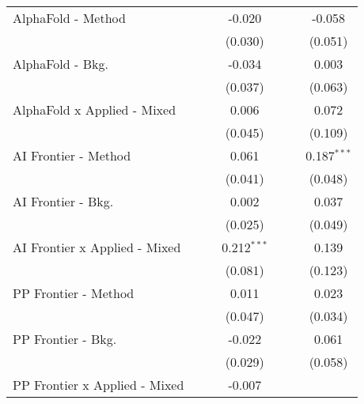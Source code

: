 \begin{tabular}{lcccccc}
   AlphaFold - Method             &              &              & -0.020         &              &         & -0.058\\   
                                  &              &              & (0.030)        &              &         & (0.051)\\   
   AlphaFold - Bkg.               &              &              & -0.034         &              &         & 0.003\\   
                                  &              &              & (0.037)        &              &         & (0.063)\\   
   AlphaFold x Applied - Mixed    &              &              & 0.006          &              &         & 0.072\\   
                                  &              &              & (0.045)        &              &         & (0.109)\\   
   AI Frontier - Method           &              &              & 0.061          &              &         & 0.187$^{***}$\\   
                                  &              &              & (0.041)        &              &         & (0.048)\\   
   AI Frontier - Bkg.             &              &              & 0.002          &              &         & 0.037\\   
                                  &              &              & (0.025)        &              &         & (0.049)\\   
   AI Frontier x Applied - Mixed  &              &              & 0.212$^{***}$  &              &         & 0.139\\   
                                  &              &              & (0.081)        &              &         & (0.123)\\   
   PP Frontier - Method           &              &              & 0.011          &              &         & 0.023\\   
                                  &              &              & (0.047)        &              &         & (0.034)\\   
   PP Frontier - Bkg.             &              &              & -0.022         &              &         & 0.061\\   
                                  &              &              & (0.029)        &              &         & (0.058)\\   
   PP Frontier x Applied - Mixed  &              &              & -0.007         &              &         &   \\   

\end{tabular}
